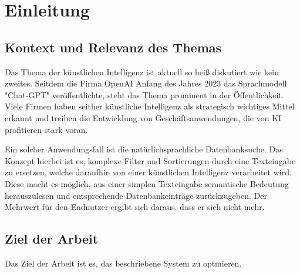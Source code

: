\section{Einleitung}

\subsection{Kontext und Relevanz des Themas}
Das Thema der künstlichen Intelligenz ist aktuell so heiß diskutiert wie kein zweites. 
Seitdem die Firma OpenAI Anfang des Jahres 2023 das Sprachmodell "Chat-GPT" veröffentlichte, steht das Thema prominent in der Öffentlichkeit. 
Viele Firmen haben seither künstliche Intelligenz als strategisch wichtiges Mittel erkannt und treiben die Entwicklung von Geschäftsanwendungen,
die von KI profitieren stark voran. 

Ein solcher Anwendungsfall ist die natürlichsprachliche Datenbanksuche. Das Konzept hierbei ist es, komplexe
Filter und Sortierungen durch eine Texteingabe zu ersetzen, welche daraufhin von einer künstlichen Intelligenz verarbeitet wird. Diese macht es
möglich, aus einer simplen Texteingabe semantische Bedeutung herauszulesen und entsprechende Datenbankeinträge zurückzugeben. Der Mehrwert für den
Endnutzer ergibt sich daraus, dass er sich nicht mehr.


\subsection{Ziel der Arbeit}
Das Ziel der Arbeit ist es, das beschriebene System zu optmieren.
